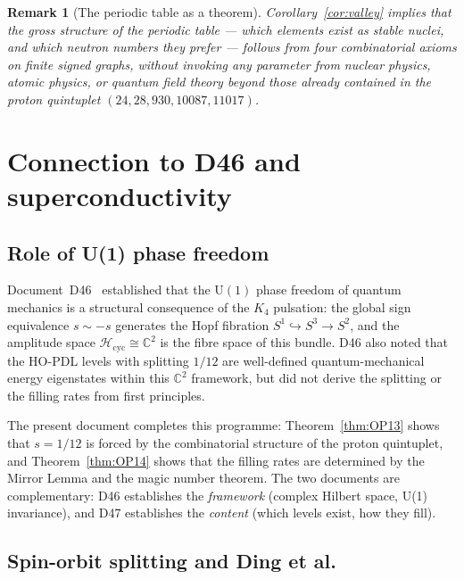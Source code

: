 \documentclass[12pt,a4paper]{article}
\newtheorem{remark}[theorem]{Remark}
\newcommand{\quintuplet}{(24,28,930,10087,11017)}
\begin{document}
\begin{remark}[The periodic table as a theorem]
Corollary~\ref{cor:valley} implies that the gross structure of the periodic table --- which elements exist as stable nuclei, and which neutron numbers they prefer --- follows from four combinatorial axioms on finite signed graphs, without invoking any parameter from nuclear physics, atomic physics, or quantum field theory beyond those already contained in the proton quintuplet $\quintuplet$.
\end{remark}

\section{Connection to D46 and superconductivity}
\label{sec:connection}

\subsection{Role of U(1) phase freedom}

Document~D46~\cite{PDL_D46_2026} established that the $\mathrm{U}(1)$ phase freedom of quantum mechanics is a structural consequence of the $K_4$ pulsation: the global sign equivalence $s \sim -s$ generates the Hopf fibration $S^1 \hookrightarrow S^3 \to S^2$, and the amplitude space $\mathcal{H}_{\mathrm{cyc}} \cong \mathbb{C}^2$ is the fibre space of this bundle. D46 also noted that the HO-PDL levels with splitting $1/12$ are well-defined quantum-mechanical energy eigenstates within this $\mathbb{C}^2$ framework, but did not derive the splitting or the filling rates from first principles.

The present document completes this programme: Theorem~\ref{thm:OP13} shows that $s = 1/12$ is forced by the combinatorial structure of the proton quintuplet, and Theorem~\ref{thm:OP14} shows that the filling rates are determined by the Mirror Lemma and the magic number theorem. The two documents are complementary: D46 establishes the \emph{framework} (complex Hilbert space, U(1) invariance), and D47 establishes the \emph{content} (which levels exist, how they fill).

\subsection{Spin-orbit splitting and Ding et al.}
\end{document}
